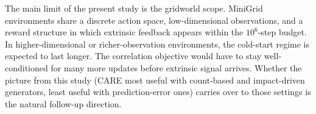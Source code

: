 The main limit of the present study is the gridworld scope. MiniGrid environments share a discrete action space, low-dimensional observations, and a reward structure in which extrinsic feedback appears within the $10^6$-step budget. In higher-dimensional or richer-observation environments, the cold-start regime is expected to last longer. The correlation objective would have to stay well-conditioned for many more updates before extrinsic signal arrives. Whether the picture from this study (CARE most useful with count-based and impact-driven generators, least useful with prediction-error ones) carries over to those settings is the natural follow-up direction.
